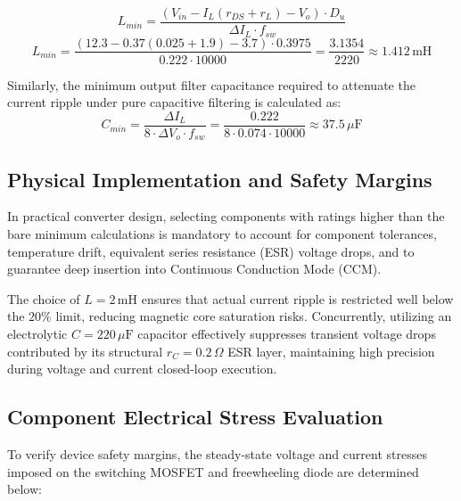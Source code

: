 \documentclass[12pt,a4paper]{article}
\begin{document}
\begin{equation}
L_{min} = \frac{\left(V_{in} - I_L(r_{DS} + r_L) - V_o\right) \cdot D_u}{\Delta I_L \cdot f_{sw}}
\end{equation}
\begin{equation}
L_{min} = \frac{\left(12.3 - 0.37(0.025 + 1.9) - 3.7\right) \cdot 0.3975}{0.222 \cdot 10000} = \frac{3.1354}{2220} \approx 1.412\,\text{mH}
\end{equation}

Similarly, the minimum output filter capacitance required to attenuate the current ripple under pure capacitive filtering is calculated as:
\begin{equation}
C_{min} = \frac{\Delta I_L}{8 \cdot \Delta V_o \cdot f_{sw}} = \frac{0.222}{8 \cdot 0.074 \cdot 10000} \approx 37.5\,\mu\text{F}
\end{equation}

\subsection{Physical Implementation and Safety Margins}
In practical converter design, selecting components with ratings higher than the bare minimum calculations is mandatory to account for component tolerances, temperature drift, equivalent series resistance (ESR) voltage drops, and to guarantee deep insertion into Continuous Conduction Mode (CCM). 

The choice of $L = 2\,\text{mH}$ ensures that actual current ripple is restricted well below the $20\%$ limit, reducing magnetic core saturation risks. Concurrently, utilizing an electrolytic $C = 220\,\mu\text{F}$ capacitor effectively suppresses transient voltage drops contributed by its structural $r_C = 0.2\,\Omega$ ESR layer, maintaining high precision during voltage and current closed-loop execution.

\subsection{Component Electrical Stress Evaluation}
To verify device safety margins, the steady-state voltage and current stresses imposed on the switching MOSFET and freewheeling diode are determined below:
\end{document}
